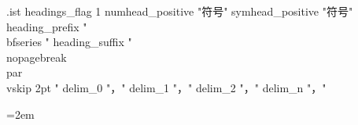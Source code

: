 \begin{filecontents*}[overwrite]{\jobname.ist}
headings_flag 1
numhead_positive "符号"
symhead_positive "符号"
heading_prefix "{\\bfseries "
heading_suffix "}\\nopagebreak\\par\\vskip 2pt "
delim_0 "，"
delim_1 "，"
delim_2 "，"
delim_n "，"
\end{filecontents*}


\usepackage[
  paperwidth=170mm,
  paperheight=248.2mm,
  inner=22mm,
  outer=18mm,
  top=20mm,
  bottom=22mm,
  headheight=15pt
]{geometry}
\usepackage{amsmath,amssymb,mathtools,amsthm,bm}
\usepackage{graphicx}
\usepackage{pict2e}
\usepackage{booktabs,longtable,array}
\usepackage{enumitem}
\usepackage{multicol}
\usepackage{imakeidx}
\usepackage{xcolor}
\usepackage{fancyhdr}
\usepackage{microtype}
\usepackage{hyperref}


\setcounter{secnumdepth}{3}
\setcounter{tocdepth}{2}
\setlength{\parindent}{2em}
\setlength{\parskip}{0pt}
\emergencystretch=2em
\renewcommand{\contentsname}{目录}
\renewcommand{\figurename}{图}
\renewcommand{\tablename}{表}
\renewcommand{\proofname}{证明}
\newcommand{\translatornote}[1]{\footnote{\textup{译者注：#1}}}

\makeindex[title={主题索引},noautomatic]


\makeatletter
\renewenvironment{theindex}{%
  \chapter*{\indexname}%
  \addcontentsline{toc}{chapter}{\indexname}%
  \markboth{\indexname}{\indexname}%
  \begingroup
  \footnotesize
  \setlength{\parindent}{0pt}%
  \setlength{\parskip}{0pt}%
  \rightskip=0pt plus 1fil\relax
  \setlength{\columnsep}{1.5em}%
  \noindent\textbf{凡例}\quad 本索引按中文无声调拼音排序；括号中保留英文源词，页码使用本译本正文印刷页码。人名对照另见“双向人名检索表”。%
  \par\vspace{0.55\baselineskip}%
  \begin{multicols}{2}%
  \raggedcolumns
  \let\item\@idxitem
}{%
  \end{multicols}%
  \endgroup
}
\renewcommand{\@idxitem}{\par\hangindent=1em\hangafter=1\relax}
\renewcommand{\subitem}{\par\hangindent=2.8em\hangafter=1\hspace*{1.4em}}
\makeatother

